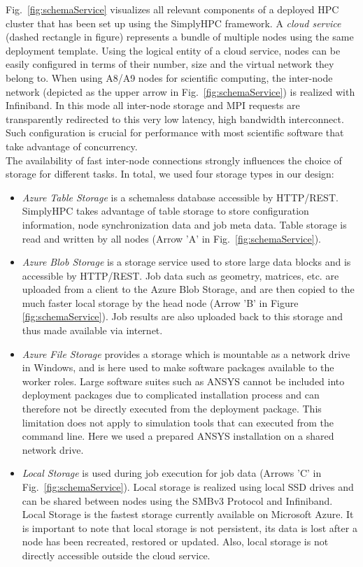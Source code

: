 \documentclass[a4paper,twoside]{article}
\begin{document}
Fig.~\ref{fig:schemaService} visualizes all relevant components of a deployed HPC cluster that has been set up using the SimplyHPC framework. 
A \textit{cloud service} (dashed rectangle in figure) represents a bundle of multiple nodes using the same deployment template. Using the logical entity of a cloud service, nodes can be easily configured in terms of their number, size and the virtual network they belong to. When using A8/A9 nodes for scientific computing, the inter-node network (depicted as the upper arrow in Fig.~\ref{fig:schemaService}) is realized with Infiniband. In this mode all inter-node storage and MPI requests are transparently redirected to this very low latency, high bandwidth interconnect. Such configuration is crucial for performance with most scientific software that take advantage of concurrency.\\
The availability of fast inter-node connections strongly influences the choice of storage for different tasks. In total, we used four storage types in our design:
\begin{itemize}

	\item \textit{Azure Table Storage} is a schemaless database accessible by HTTP/REST. SimplyHPC takes advantage of table storage to store configuration information, node synchronization data and job meta data. Table storage is read and written by all nodes (Arrow 'A' in Fig.~\ref{fig:schemaService}).
	
	\item \textit{Azure Blob Storage} is a storage service used to store large data blocks and is accessible by HTTP/REST. Job data such as geometry, matrices, etc. are uploaded from a client to the Azure Blob Storage, and are then copied to the much faster local storage by the head node (Arrow 'B' in Figure \ref{fig:schemaService}). Job results are also uploaded back to this storage and thus made available via internet.	
	
	\item \textit{Azure File Storage} provides a storage which is mountable as a network drive in Windows, and is here used to make software packages available to the worker roles. Large software suites such as ANSYS cannot be included into deployment packages due to complicated installation process and can therefore not be directly executed from the deployment package. This limitation does not apply to simulation tools that can executed from the command line. Here we used a prepared ANSYS installation on a shared network drive.
	
	\item \textit{Local Storage} is used during job execution for job data (Arrows 'C' in Fig.~\ref{fig:schemaService}). Local storage is realized using local SSD drives and can be shared between nodes using the SMBv3 Protocol and Infiniband. Local Storage is the fastest storage currently available on Microsoft Azure. It is important to note that local storage is not persistent, its data is lost after a node has been recreated, restored or updated. Also, local storage is not directly accessible outside the cloud service.

\end{itemize}
\end{document}
